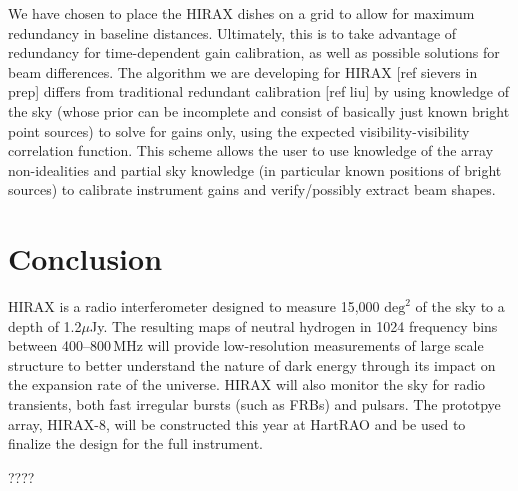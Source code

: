 \documentclass[]{spie}  %
\begin{document}
We have chosen to place the HIRAX dishes on a grid to allow for maximum redundancy in baseline distances. Ultimately, this is to take advantage of redundancy for time-dependent gain calibration, as well as possible solutions for beam differences. The algorithm we are developing for HIRAX [ref sievers in prep] differs from traditional redundant calibration [ref liu] by using knowledge of the sky (whose prior can be incomplete and consist of basically just known bright point sources) to solve for gains only, using the expected visibility-visibility correlation function. This scheme allows the user to use knowledge of the array non-idealities and partial sky knowledge (in particular known positions of bright sources) to calibrate instrument gains and verify/possibly extract beam shapes. \newline

\section{Conclusion}

HIRAX is a radio interferometer designed to measure 15,000 $\mathrm{deg}^{2}$ of the sky to a depth of 1.2$\mu$Jy. The resulting maps of neutral hydrogen in 1024 frequency bins between 400--800\,MHz will provide low-resolution measurements of large scale structure to better understand the nature of dark energy through its impact on the expansion rate of the universe. HIRAX will also monitor the sky for radio transients, both fast irregular bursts (such as FRBs) and pulsars. The prototpye array, HIRAX-8, will be constructed this year at HartRAO and be used to finalize the design for the full instrument.

\label{sec:conc}



   

\acknowledgments %
 
????

\end{document}
